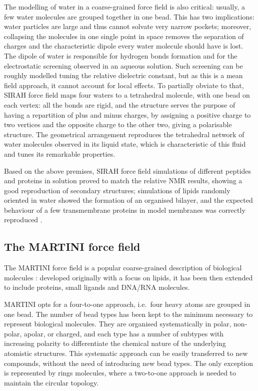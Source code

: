 The modelling of water in a coarse-grained force field is also critical: usually, a few water molecules are grouped together in one bead. This has two implications: water particles are large and thus cannot solvate very narrow pockets; moreover, collapsing the molecules in one single point in space removes the separation of charges and the characteristic dipole every water molecule should have is lost. The dipole of water is responsible for hydrogen bonds formation and for the electrostatic screening observed in an aqueous solution. Such screening can be roughly modelled tuning the relative dielectric constant, but as this is a mean field approach, it cannot account for local effects.
%
To partially obviate to that, SIRAH force field maps four waters to a tetrahedral molecule, with one bead on each vertex: all the bonds are rigid, and the structure serves the purpose of having a repartition of plus and minus charges, by assigning a positive charge to two vertices and the opposite charge to the other two, giving a polarisable structure. The geometrical arrangement reproduces the tetrahedral network of water molecules observed in its liquid state, which is characteristic of this fluid and tunes its remarkable properties.

Based on the above premises, SIRAH force field simulations of different peptides and proteins in solution proved to match the relative NMR results, showing a good reproduction of secondary structures; simulations of lipids randomly oriented in water showed the formation of an organised bilayer, and the expected behaviour of a few transmembrane proteins in model membranes was correctly reproduced \citep{Machado2018,Barrera2019}.

 
\subsection{The MARTINI force field}

The MARTINI force field is a popular coarse-grained description of biological molecules \cite{Marrink2007,Monticelli2008,DeJong2013}: developed originally with a focus on lipids, it has been then extended to include proteins, small ligands and DNA/RNA molecules.

MARTINI opts for a four-to-one approach, i.e.\ four heavy atoms are grouped in one bead. The number of bead types has been kept to the minimum necessary to represent biological molecules. They are organised systematically in polar, non-polar, apolar, or charged, and each type has a number of subtypes with increasing polarity to differentiate the chemical nature of the underlying atomistic structures.
%
This systematic approach can be easily transferred to new compounds, without the need of introducing new bead types.
%
The only exception is represented by rings molecules, where a two-to-one approach is needed to maintain the circular topology.

